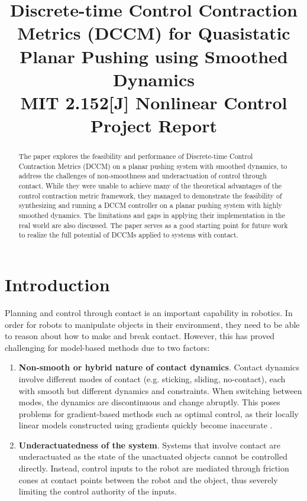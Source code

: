 \documentclass[journal]{IEEEtran}
\begin{document}
\title{Discrete-time Control Contraction Metrics (DCCM) for Quasistatic Planar Pushing using Smoothed Dynamics\\
{\footnotesize MIT 2.152[J] Nonlinear Control Project Report}
}

\author{
}

\maketitle

\begin{abstract}
The paper explores the feasibility and performance of Discrete-time Control Contraction Metrics (DCCM) on a planar pushing system with smoothed dynamics, to address the challenges of non-smoothness and underactuation of control through contact. While they were unable to achieve many of the theoretical advantages of the control contraction metric framework, they managed to demonstrate the feasibility of synthesizing and running a DCCM controller on a planar pushing system with highly smoothed dynamics. The limitations and gaps in applying their implementation in the real world are also discussed. The paper serves as a good starting point for future work to realize the full potential of DCCMs applied to systems with contact.
\end{abstract}

\section{Introduction} \label{sec:introduction}
Planning and control through contact is an important capability in robotics. In order for robots to manipulate objects in their environment, they need to be able to reason about how to make and break contact. However, this has proved challenging for model-based methods due to two factors:
\begin{enumerate}
	\item{\bf Non-smooth or hybrid nature of contact dynamics}. Contact dynamics involve different modes of contact (e.g. sticking, sliding, no-contact), each with smooth but different dynamics and constraints. When switching between modes, the dynamics are discontinuous and change abruptly. This poses problems for gradient-based methods such as optimal control, as their locally linear models constructed using gradients quickly become inaccurate \autocite{pangGlobalPlanningContactRich2023}.
	\item{\bf Underactuatedness of the system}. Systems that involve contact are underactuated as the state of the unactuated objects cannot be controlled directly. Instead, control inputs to the robot are mediated through friction cones at contact points between the robot and the object, thus severely limiting the control authority of the inputs.
\end{enumerate}
\end{document}
